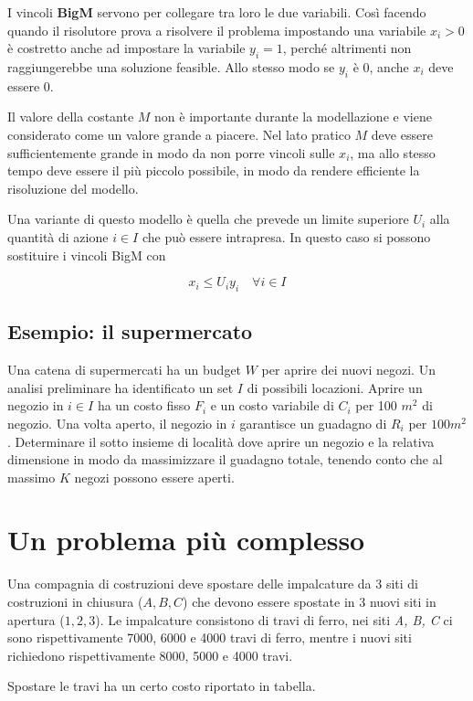 I vincoli \textbf{BigM} servono per collegare tra loro le due variabili.
Così facendo quando il risolutore prova a risolvere il problema impostando una variabile $x_i > 0$ è costretto anche ad impostare la variabile $y_i = 1$, perché altrimenti non raggiungerebbe una soluzione feasible. Allo stesso modo se $y_i$ è 0, anche $x_i$ deve essere 0.

Il valore della costante $M$ non è importante durante la modellazione e viene considerato come un valore grande a piacere.
Nel lato pratico $M$ deve essere sufficientemente grande in modo da non porre vincoli sulle $x_i$, ma allo stesso tempo deve essere il più piccolo possibile, in modo da rendere efficiente la risoluzione del modello.

Una variante di questo modello è quella che prevede un limite superiore $U_i$ alla quantità di azione $i \in I$ che può essere intrapresa. In questo caso si possono sostituire i vincoli BigM con 

$$
x_i \leq U_i y_i \quad \forall i \in I
$$

\subsection{Esempio: il supermercato}

Una catena di supermercati ha un budget $W$ per aprire dei nuovi negozi. Un analisi preliminare ha identificato un set $I$ di possibili locazioni.
Aprire un negozio in $i \in I$ ha un costo fisso $F_i$ e un costo variabile di $C_i$ per 100 $m^2$ di negozio.
Una volta aperto, il negozio in $i$ garantisce un guadagno di $R_i$ per $100 m^2$. Determinare il sotto insieme di località dove aprire un negozio e la relativa dimensione in modo da massimizzare il guadagno totale, tenendo conto che al massimo $K$ negozi possono essere aperti.

\section{Un problema più complesso}

Una compagnia di costruzioni deve spostare delle impalcature da 3 siti di costruzioni in chiusura ($A,B,C$) che devono essere spostate in 3 nuovi siti in apertura ($1,2,3$).
Le impalcature consistono di travi di ferro, nei siti \textit{A, B, C} ci sono rispettivamente 7000, 6000 e 4000 travi di ferro, mentre i nuovi siti richiedono rispettivamente 8000, 5000 e 4000 travi. 

Spostare le travi ha un certo costo riportato in tabella.

